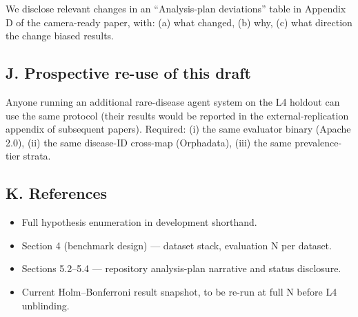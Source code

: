 We disclose relevant changes in an ``Analysis-plan deviations''
table in Appendix D of the camera-ready paper, with: (a) what changed,
(b) why, (c) what direction the change biased results.

\subsection{J. Prospective re-use of this draft}\label{j.-prospective-re-use-of-this-draft}

Anyone running an additional rare-disease agent system on the L4 holdout
can use the same protocol (their results would be reported in the
external-replication appendix of subsequent papers). Required:
(i) the same evaluator binary (Apache 2.0), (ii) the same disease-ID
cross-map (Orphadata), (iii) the same prevalence-tier strata.

\subsection{K. References}\label{k.-references}

\begin{itemize}
\tightlist
\item
  Full hypothesis enumeration in development shorthand.
\item
  Section 4 (benchmark design) --- dataset stack, evaluation N per
  dataset.
\item
  Sections 5.2--5.4 --- repository analysis-plan narrative and status disclosure.
\item
  Current Holm--Bonferroni result snapshot, to be re-run at full N
  before L4 unblinding.
\end{itemize}


